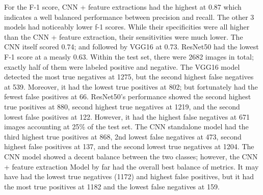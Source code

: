 \documentclass[10pt,twocolumn]{article}
\begin{document}
For the F-1 score, CNN + feature extractions had the highest at 0.87 which indicates a well balanced performance between precision and recall. The other 3 models had noticeably lower f-1 scores. While their specificities were all higher than the CNN + feature extraction, their sensitivities were much lower. The CNN itself scored 0.74; and followed by VGG16 at 0.73. ResNet50 had the lowest F-1 score at a measly 0.63. \newline
Within the test set, there were 2682 images in total; exactly half of them were labeled positive and negative. The VGG16 model detected the most true negatives at 1275, but the second highest false negatives at 539. Moreover, it had the lowest true positives at 802; but fortunately had the fewest false positives at 66. \newline ResNet50’s performance showed the second highest true positives at 880, second highest true negatives at 1219, and the second lowest false positives at 122. However, it had the highest false negatives at 671 images accounting at 25\% of the test set. \newline The CNN standalone model had the third highest true positives at 868, 2nd lowest false negatives at 473, second highest false positives at 137, and the second lowest true negatives at 1204. The CNN model showed a decent balance between the two classes; however, the CNN + feature extraction Model by far had the overall best balance of metrics. It may have had the lowest true negatives (1172) and highest false positives, but it had the most true positives at 1182 and the lowest false negatives at 159.
\newline
\end{document}
